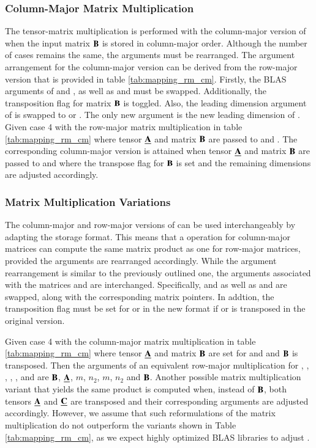 \subsubsection{Column-Major Matrix Multiplication}
The tensor-matrix multiplication is performed with the column-major version of  when the input matrix $\mathbf{B}$ is stored in column-major order.
Although the number of  cases remains the same, the  arguments must be rearranged.
The argument arrangement for the column-major version can be derived from the row-major version that is provided in table \ref{tab:mapping_rm_cm}.
Firstly, the BLAS arguments of  and , as well as  and  must be swapped.
Additionally, the transposition flag for matrix $\mathbf{B}$ is toggled.
Also, the leading dimension argument of  is swapped to  or .
The only new argument is the new leading dimension of .
Given case 4 with the row-major matrix multiplication in table \ref{tab:mapping_rm_cm} where tensor $\underline{\mathbf{A}}$ and matrix $\mathbf{B}$ are passed to  and .
The corresponding column-major version is attained when tensor $\underline{\mathbf{A}}$ and matrix $\mathbf{B}$ are passed to  and  where the transpose flag for $\mathbf{B}$ is set and the remaining dimensions are adjusted accordingly.


\subsubsection{Matrix Multiplication Variations}
The column-major and row-major versions of  can be used interchangeably by adapting the storage format. 
This means that a  operation for column-major matrices can compute the same matrix product as one for row-major matrices, provided the arguments are rearranged accordingly.
While the argument rearrangement is similar to the previously outlined one, the arguments associated with the matrices  and  are interchanged.
Specifically,  and  as well as  and  are swapped, along with the corresponding matrix pointers.
In addtion, the transposition flag must be set for  or  in the new format if  or  is transposed in the original version.

Given case 4 with the column-major matrix multiplication in table \ref{tab:mapping_rm_cm} where tensor $\underline{\mathbf{A}}$ and matrix $\mathbf{B}$ are set for  and  and $\mathbf{B}$ is transposed.
Then the arguments of an equivalent row-major multiplication for , , , , ,  and  are $\mathbf{B}$, $\underline{\mathbf{A}}$, $m$, $n_2$, $m$, $n_2$ and $\mathbf{B}$.
Another possible matrix multiplication variant that yields the same product is computed when, instead of $\mathbf{B}$, both tensors $\underline{\mathbf{A}}$ and $\underline{\mathbf{C}}$ are transposed and their corresponding arguments are adjusted accordingly. 
However, we assume that such reformulations of the matrix multiplication do not outperform the variants shown in Table \ref{tab:mapping_rm_cm}, as we expect highly optimized BLAS libraries to adjust .



